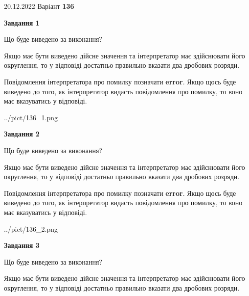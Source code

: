\documentclass[12pt, ukrainian]{article}
\begin{document}
{20.12.2022 Варіант \No \textbf { 136 }\par}
{
\begin {Large}

{\begin {center}\textbf{Завдання 1}\end {center}}\par
Що буде виведено за виконання? \par

Якщо має бути виведено дійсне значення та інтерпретатор має здійснювати його округлення, 
то у відповіді достатньо правильно вказати два дробових розряди.

Повідомлення інтерпретатора про помилку позначати \textbf{error}.
Якщо щось буде виведено до того, як інтерпретатор видасть повідомлення про помилку, 
то воно має вказуватись у відповіді. \par

\begin{center}
	{../pict/136_1.png}
\end{center}
\newpage

{\begin {center}\textbf{Завдання 2}\end {center}}\par
Що буде виведено за виконання? \par

Якщо має бути виведено дійсне значення та інтерпретатор має здійснювати його округлення, 
то у відповіді достатньо правильно вказати два дробових розряди.

Повідомлення інтерпретатора про помилку позначати \textbf{error}.
Якщо щось буде виведено до того, як інтерпретатор видасть повідомлення про помилку, 
то воно має вказуватись у відповіді. \par

\begin{center}
	{../pict/136_2.png}
\end{center}
\newpage

{\begin {center}\textbf{Завдання 3}\end {center}}\par
Що буде виведено за виконання? \par

Якщо має бути виведено дійсне значення та інтерпретатор має здійснювати його округлення, 
то у відповіді достатньо правильно вказати два дробових розряди.


\end{Large}}
\end{document}
